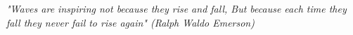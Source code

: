\thispagestyle{plain}

\begin{center}
 \Large\em\null\vskip5cm "Waves are inspiring not because they rise and fall, But because each time they fall they never fail to rise again" (Ralph Waldo Emerson) \\[3cm]
\end{center}
